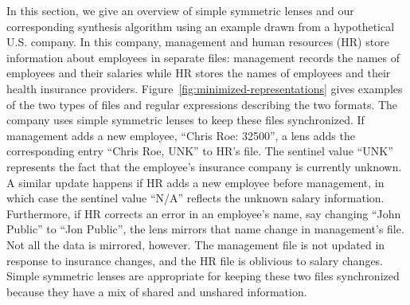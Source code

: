 \documentclass[acmsmall,screen,anonymous]{acmart}
\begin{document}
In this section, we give an overview of simple symmetric lenses and
our corresponding synthesis algorithm using an example drawn from a
hypothetical U.S. company.  In this company, management and
human resources (HR) store information about employees in separate files:
management records the names of employees and their salaries while
HR stores the names of employees and their health
insurance providers.  Figure~\ref{fig:minimized-representations} gives
examples of the two types of files and regular expressions describing
the two formats.
The company uses simple symmetric lenses to keep these files synchronized.
If management adds a new employee, ``Chris Roe: 32500'',  a lens adds 
the corresponding entry ``Chris Roe, UNK'' to HR's file.  The
sentinel value ``UNK'' represents the fact that the employee's
insurance company is currently unknown.  A similar update happens if
HR adds a new employee before management, in which case the sentinel
value ``N/A'' reflects the unknown salary information. 
Furthermore, if HR
corrects an error in an employee's name, say changing ``John Public''
to ``Jon Public'', the lens mirrors that name change in management's
file. Not all the data is mirrored, however. The management file 
is not updated in response to insurance changes, and the HR file
is oblivious to salary changes.  Simple symmetric lenses are
appropriate for keeping these two files synchronized because they have
a mix of shared and unshared information.

%
\end{document}
